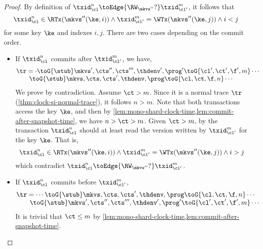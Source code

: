 \begin{proof}
    By definition of \( \txid_\cl^n \toEdge{\RW_{\mkvs''}?} \txid_{\cl'}^m \),
    it follows that
    \[
        \txid_\cl^n \in \RTx(\mkvs''(\ke,i)) 
        \land \txid_{\cl'}^m = \WTx(\mkvs''(\ke,j)) 
        \land i < j
    \]                              
    for some key \( \ke \) and indexes \( i,j \).
    There are two cases depending on the commit order.
    \begin{itemize}
        \item If \( \txid_\cl^n \) commits after \( \txid_{\cl'}^m  \),
            we have,
            \[
                \begin{array}{@{}l@{}}
                \tr = \cdot \toG{\stub} \mkvs',\cts'',\cts''',\thdenv', \prog' \toG{\cl',\ct',\f',m} \cdots \\
                \qquad \toG{\stub} \mkvs,\cts,\cts',\thdenv, \prog \toG{\cl,\ct,\f,n} \cdots \\
                \end{array}
            \]
            We prove by contradiction.
            Assume \( \ct > m \).
            Since it is a normal trace \( \tr \) (\cref{thm:clock-si-normal-trace}), 
            it follows \( n > m \).
            Note that both transactions access the key \( \ke \), and then by \cref{lem:mono-shard-clock-time,lem:commit-after-snapshot-time}, we have \( n > \ct > m  \).
            Given \( \ct > m \), by  the transaction \( \txid_\cl^n \) should at least read the version written by \( \txid_{\cl'}^m \) for the key \( \ke \).
            That is,
            \[
                \txid_\cl^n \in \RTx(\mkvs''(\ke,i)) 
                \land \txid_{\cl'}^m = \WTx(\mkvs''(\ke,j)) 
                \land i > j
            \]
            which contradict  \( \txid_\cl^n \toEdge{\RW_{\mkvs''}?} \txid_{\cl'}^m  \).
        \item If \( \txid_\cl^n \) commits before \( \txid_{\cl'}^m  \),
            \[
                \begin{array}{@{}l@{}}
                    \tr = \cdots \toG{\stub} \mkvs,\cts,\cts',\thdenv, \prog \toG{\cl,\ct,\f,n} \cdots  \\
                    \qquad  \toG{\stub} \mkvs',\cts'',\cts''',\thdenv', \prog' \toG{\cl',\ct',\f',m} \cdots
                \end{array}
            \]
            It is trivial that \( \ct \leq m \) by \cref{lem:mono-shard-clock-time,lem:commit-after-snapshot-time}.
    \end{itemize}
\end{proof}


